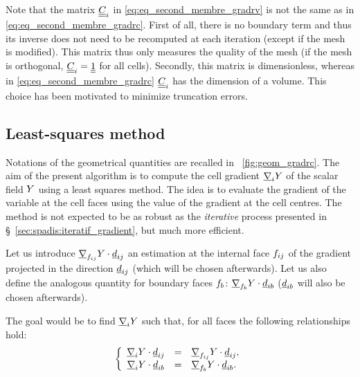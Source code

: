 \begin{remark}
Note that the matrix $\underline{\underline{C}}_{i}$ in \eqref{eq:eq_second_membre_gradrv} is not the same as in \eqref{eq:eq_second_membre_gradrc}. First of all,
there is no boundary term and thus its inverse does not need  to be recomputed at each iteration (except if the mesh is modified). This matrix thus  only
measures the quality of the mesh (if the mesh is orthogonal, $\underline{\underline{C}}_{i} = \underline{\underline{1}}$ for all cells).
Secondly, this matrix is dimensionless, whereas in \eqref{eq:eq_second_membre_gradrc} $\underline{\underline{C}}_i$ has the dimension of a volume. This choice has
been motivated to minimize truncation errors.
\end{remark}

\subsection{Least-squares method}\label{sec:spadis:least_squares_gradient}
%
Notations of the geometrical quantities are recalled in \figurename~\ref{fig:geom_gradrc}.
The aim of the present algorithm is to compute the cell gradient $\underline{\nabla}_{i} Y $ of the scalar field $Y$
using a least squares method.
The idea is to evaluate the gradient of the variable at the cell faces using the value of the gradient at the cell centres.
The method is not expected to be as robust as the \emph{iterative} process presented in \S~\ref{sec:spadis:iteratif_gradient},
but much more efficient.

Let us introduce $\underline{\nabla}_{f_{ij}} Y \cdot \underline{d}_{ij}$  an estimation at the internal face ${f_{ij}}$
of the gradient projected in the direction $\underline{d}_{ij}$ (which will be chosen afterwards).
Let us also define the analogous quantity for boundary faces ${f_{b}}$: $\underline{\nabla}_{f_{b}} Y \cdot \underline{d}_{ib}$
 ($\underline{d}_{ib}$ will also be chosen afterwards).

The goal would be to find $\underline{\nabla}_{i} Y $ such that, for all faces
the following relationships hold:
\begin{equation}
\left\{\begin{array}{r c l}
\underline{\nabla}_{i} Y  \cdot \underline{d}_{ij} &=& \underline{\nabla}_{f_{ij}} Y \cdot \underline{d}_{ij} , \\
\underline{\nabla}_{i} Y  \cdot \underline{d}_{ib} &=& \underline{\nabla}_{f_{b}} Y \cdot \underline{d}_{ib} .
\end{array}\right.
\end{equation}

